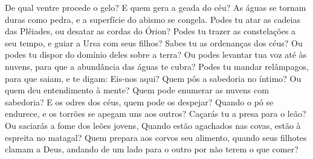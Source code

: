 {De qual ventre procede o gelo? E quem gera a geada do céu?
As águas se tornam duras como pedra, e a superfície do abismo se congela.
Podes tu atar as cadeias das Plêiades, ou desatar as cordas do Órion?
Podes tu trazer as constelações
 a seu tempo, e guiar a Ursa com seus filhos?
Sabes tu as ordenanças dos céus? Ou podes tu dispor do domínio deles sobre a terra?
Ou podes levantar tua voz até às nuvens, para que a abundância das águas te cubra?
Podes tu mandar relâmpagos, para que saiam, e te digam: Eis-nos aqui?
Quem pôs a sabedoria no íntimo? Ou quem deu entendimento à mente?
Quem pode enumerar as nuvens com sabedoria? E os odres dos céus, quem pode os despejar?
Quando o pó se endurece, e os torrões se apegam uns aos outros?
Caçarás tu a presa para o leão? Ou saciarás a fome dos leões jovens,
Quando estão agachados nas covas,
{} estão à espreita no matagal?
Quem prepara aos corvos seu alimento, quando seus filhotes clamam a Deus, andando de um lado para o outro por não terem o que comer?

}
